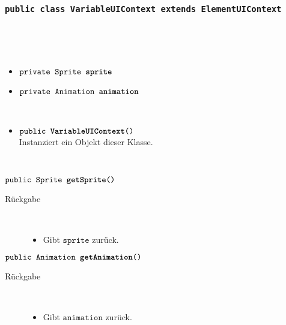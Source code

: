 		\subsubsection{\normalfont \texttt{public class \textbf{VariableUIContext} extends ElementUIContext}}

\begin{description}
\item[Beschreibung] \hfill \\ 
\item[Attribute] \hfill \\
	\vspace{-.8cm}
	\begin{itemize}	
		\item $\texttt{private Sprite \textbf{sprite}}$ \\ 		
		\item $\texttt{private Animation \textbf{animation}}$ \\ 
		\end{itemize}
	
\item[Konstruktoren] \hfill \\
	\vspace{-.8cm}
	\begin{itemize}
		\item $\texttt{public \textbf{VariableUIContext}()}$ \\ Instanziert ein Objekt dieser Klasse.

	\end{itemize}
	
\item[Methoden] \hfill \\
	\vspace{-.8cm}
		\item $\texttt{public Sprite \textbf{getSprite}()}$ \\ 
		\begin{description}
			\item[Rückgabe] \hfill \\
			\vspace{-.8cm}
			\begin{itemize}
				\item Gibt $\texttt{sprite}$ zurück.
			\end{itemize}
			\end{description}
			
		\item $\texttt{public Animation \textbf{getAnimation}()}$ \\ 
		\begin{description}
			\item[Rückgabe] \hfill \\
			\vspace{-.8cm}
			\begin{itemize}
				\item Gibt $\texttt{animation}$ zurück.
			\end{itemize}
			\end{description}
			
			

	\end{description}
			
